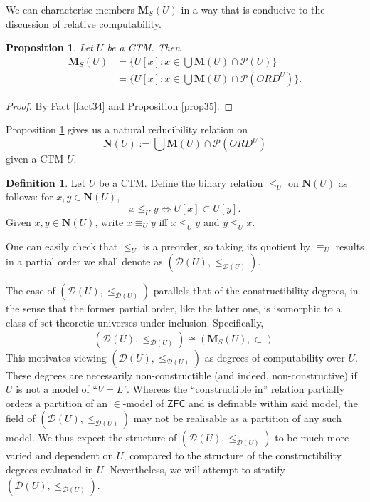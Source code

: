 \documentclass[12pt, twoside]{memoir}
\numberwithin{equation}{section}
\newtheorem{prop}[thm]{Proposition}
\theoremstyle{definition}
\newtheorem{defi}[thm]{Definition}
\theoremstyle{remark}
\theoremstyle{definition}
\theoremstyle{definition}
\theoremstyle{definition}
\theoremstyle{remark}
\begin{document}
We can characterise members $\mathbf{M}_{S}(U)$ in a way that is conducive to the discussion of relative computability.

\begin{prop}\label{prop37}
Let $U$ be a CTM. Then
\begin{align*}
    \mathbf{M}_{S}(U) & = \{U[x] : x \in \bigcup \mathbf{M}(U) \cap \mathcal{P}(U)\} \\
    & = \{U[x] : x \in \bigcup \mathbf{M}(U) \cap \mathcal{P}(ORD^U)\} \text{.}
\end{align*}
\end{prop}

\begin{proof}
By Fact \ref{fact34} and Proposition \ref{prop35}.
\end{proof}

Proposition \ref{prop37} gives us a natural reducibility relation on 
\begin{equation*}
    \mathbf{N}(U) := \bigcup \mathbf{M}(U) \cap \mathcal{P}(ORD^U)
\end{equation*}
given a CTM $U$. 

\begin{defi}
Let $U$ be a CTM. Define the binary relation $\leq_U$ on $\mathbf{N}(U)$ as follows: for $x, y \in \mathbf{N}(U)$,
\begin{equation*}
    x \leq_U y \iff U[x] \subset U[y] \text{.}
\end{equation*}
Given $x, y \in \mathbf{N}(U)$, write $x \equiv_U y$ iff $x \leq_U y$ and $y \leq_U x$.
\end{defi}

One can easily check that $\leq_U$ is a preorder, so taking its quotient by $\equiv_U$ results in a partial order we shall denote as $(\mathcal{D}(U), \leq_{\mathcal{D}(U)})$.

The case of $(\mathcal{D}(U), \leq_{\mathcal{D}(U)})$ parallels that of the constructibility degrees, in the sense that the former partial order, like the latter one, is isomorphic to a class of set-theoretic universes under inclusion. Specifically, 
\begin{equation*}
   (\mathcal{D}(U), \leq_{\mathcal{D}(U)}) \cong (\mathbf{M}_S(U), \subset) \text{.} 
\end{equation*} 
This motivates viewing $(\mathcal{D}(U), \leq_{\mathcal{D}(U)})$ as degrees of computability over $U$. These degrees are necessarily non-constructible (and indeed, non-constructive) if $U$ is not a model of ``$V = L$''. Whereas the ``constructible in'' relation partially orders a partition of an $\in$-model of $\mathsf{ZFC}$ and is definable within said model, the field of $(\mathcal{D}(U), \leq_{\mathcal{D}(U)})$ may not be realisable as a partition of any such model. We thus expect the structure of $(\mathcal{D}(U), \leq_{\mathcal{D}(U)})$ to be much more varied and dependent on $U$, compared to the structure of the constructibility degrees evaluated in $U$. Nevertheless, we will attempt to stratify $(\mathcal{D}(U), \leq_{\mathcal{D}(U)})$.
\end{document}
